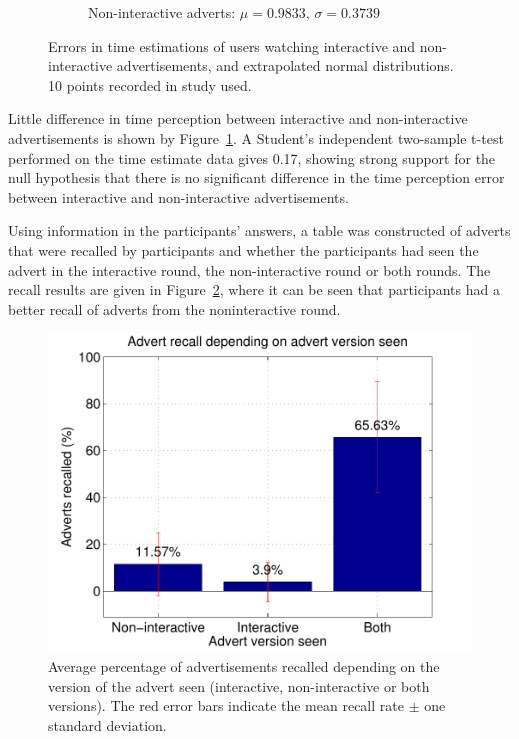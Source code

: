 \begin{figure}[!h]
\begin{subfigure}[h]{0.49\textwidth}
			\caption{Non-interactive adverts: $\mu=0.9833$, $\sigma=0.3739$}
		\end{subfigure}
		\caption{Errors in time estimations of users watching interactive and non-interactive advertisements, and extrapolated normal distributions. 10 points recorded in study used.}
		\label{fig:time_perception}
	\end{figure}
	Little difference in time perception between interactive and non-interactive advertisements is shown by Figure~\ref{fig:time_perception}. A Student's independent two-sample t-test performed on the time estimate data gives 0.17, showing strong support for the null hypothesis that there is no significant difference in the time perception error between interactive and non-interactive advertisements.

	Using information in the participants' answers, a table was constructed of adverts that were recalled by participants and whether the participants had seen the advert in the interactive round, the non-interactive round or both rounds. The recall results are given in Figure~\ref{fig:recall}, where it can be seen that participants had a better recall of adverts from the noninteractive round. 

	\begin{figure}[!h]
		\centering
		\includegraphics[width=\textwidth]{images/recall.pdf}
		\caption{Average percentage of advertisements recalled depending on the version of the advert seen (interactive, non-interactive or both versions). The red error bars indicate the mean recall rate $\pm$ one standard deviation.}
		\label{fig:recall}
	\end{figure}

